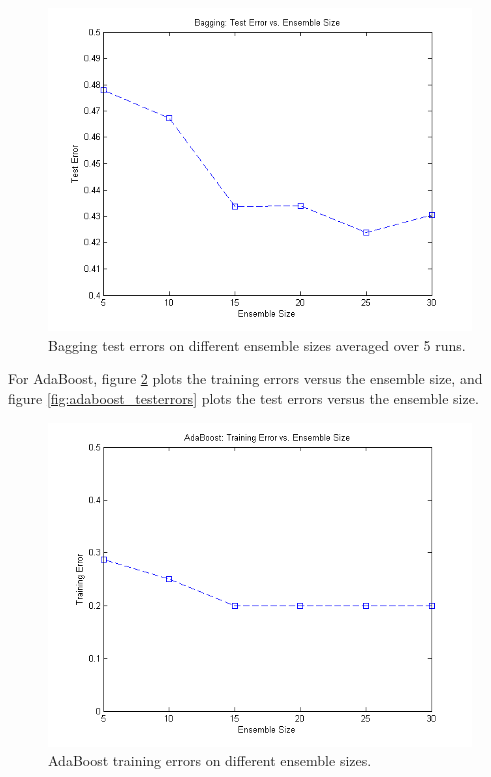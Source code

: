 \documentclass[12pt]{article}
\begin{document}
\begin{figure}[!t]
  \centering
  \includegraphics[scale=.6]{img/bagging_testerrors.png}
  \caption{Bagging test errors on different ensemble sizes averaged over 5 runs.}
  \label{fig:bagging_testerrors}
\end{figure}

For AdaBoost, figure \ref{fig:adaboost_trainerrors} plots the training errors versus the ensemble size, and figure \ref{fig:adaboost_testerrors} plots the test errors versus the ensemble size.

\begin{figure}[!t]
  \centering
  \includegraphics[scale=.6]{img/adaboost_trainerrors.png}
  \caption{AdaBoost training errors on different ensemble sizes.}
  \label{fig:adaboost_trainerrors}
\end{figure}
\end{document}

